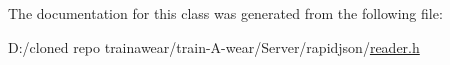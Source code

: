 The documentation for this class was generated from the following file\+:\begin{DoxyCompactItemize}
\item 
D\+:/cloned repo trainawear/train-\/\+A-\/wear/\+Server/rapidjson/\mbox{\hyperlink{reader_8h}{reader.\+h}}\end{DoxyCompactItemize}
